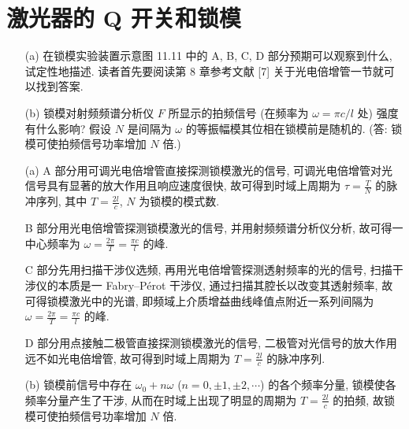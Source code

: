 \documentclass[twoside]{note}
\begin{document}
\fi
\setcounter{chapter}{10}
\chapter{激光器的 Q 开关和锁模}
\begin{exe}
    \begin{itemize}
        \item[(a)] 在锁模实验装置示意图 11.11 中的 A, B, C, D 部分预期可以观察到什么, 试定性地描述. 读者首先要阅读第 8 章参考文献 [7] 关于光电倍增管一节就可以找到答案.
        \item[(b)] 锁模对射频频谱分析仪 $F$ 所显示的拍频信号 (在频率为 $\omega=\pi c/l$ 处) 强度有什么影响? 假设 $N$ 是间隔为 $\omega$ 的等振幅模其位相在锁模前是随机的. (答: 锁模可使拍频信号功率增加 $N$ 倍.)
    \end{itemize}
\end{exe}
\begin{sol}
    \begin{itemize}
        \item[(a)] A 部分用可调光电倍增管直接探测锁模激光的信号, 可调光电倍增管对光信号具有显著的放大作用且响应速度很快, 故可得到时域上周期为 $\tau=\frac{T}{N}$ 的脉冲序列, 其中 $T=\frac{2l}{c}$, $N$ 为锁模的模式数.

        B 部分用光电倍增管探测锁模激光的信号, 并用射频频谱分析仪分析, 故可得一中心频率为 $\omega=\frac{2\pi}{T}=\frac{\pi c}{l}$ 的峰.

        C 部分先用扫描干涉仪选频, 再用光电倍增管探测透射频率的光的信号, 扫描干涉仪的本质是一 Fabry–Pérot 干涉仪, 通过扫描其腔长以改变其透射频率, 故可得锁模激光中的光谱, 即频域上介质增益曲线峰值点附近一系列间隔为 $\omega=\frac{2\pi}{T}=\frac{\pi c}{l}$ 的峰.

        D 部分用点接触二极管直接探测锁模激光的信号, 二极管对光信号的放大作用远不如光电倍增管, 故可得到时域上周期为 $T=\frac{2l}{c}$ 的脉冲序列.
        \item[(b)] 锁模前信号中存在 $\omega_0+n\omega$ ($n=0,\pm 1,\pm 2,\cdots$) 的各个频率分量, 锁模使各频率分量产生了干涉, 从而在时域上出现了明显的周期为 $T=\frac{2l}{c}$ 的拍频, 故锁模可使拍频信号功率增加 $N$ 倍.
    \end{itemize}
\end{sol}
\end{document}
